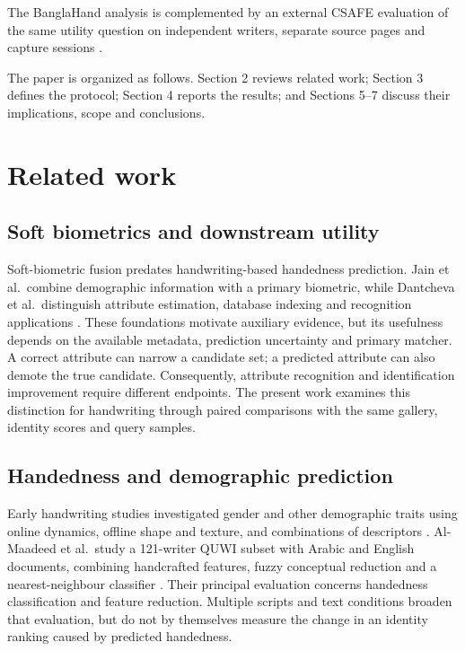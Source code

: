 The BanglaHand analysis is complemented by an external CSAFE evaluation of the same utility question on independent writers, separate source pages and capture sessions \cite{crawford2020database,crawford2026csafe}.

The paper is organized as follows. Section 2 reviews related work; Section 3 defines the protocol; Section 4 reports the results; and Sections 5--7 discuss their implications, scope and conclusions.

\section{Related work}
\label{sec:related}
\subsection{Soft biometrics and downstream utility}
Soft-biometric fusion predates handwriting-based handedness prediction. Jain et al.\ combine demographic information with a primary biometric, while Dantcheva et al.\ distinguish attribute estimation, database indexing and recognition applications \cite{jain2004soft,dantcheva2016soft}. These foundations motivate auxiliary evidence, but its usefulness depends on the available metadata, prediction uncertainty and primary matcher. A correct attribute can narrow a candidate set; a predicted attribute can also demote the true candidate. Consequently, attribute recognition and identification improvement require different endpoints. The present work examines this distinction for handwriting through paired comparisons with the same gallery, identity scores and query samples.

\subsection{Handedness and demographic prediction}
Early handwriting studies investigated gender and other demographic traits using online dynamics, offline shape and texture, and combinations of descriptors \cite{liwicki2011gender,siddiqi2015gender,bouadjenek2016soft,hassaine2013icdar}. Al-Maadeed et al.\ study a 121-writer QUWI subset with Arabic and English documents, combining handcrafted features, fuzzy conceptual reduction and a nearest-neighbour classifier \cite{almaadeed2016handedness}. Their principal evaluation concerns handedness classification and feature reduction. Multiple scripts and text conditions broaden that evaluation, but do not by themselves measure the change in an identity ranking caused by predicted handedness.

